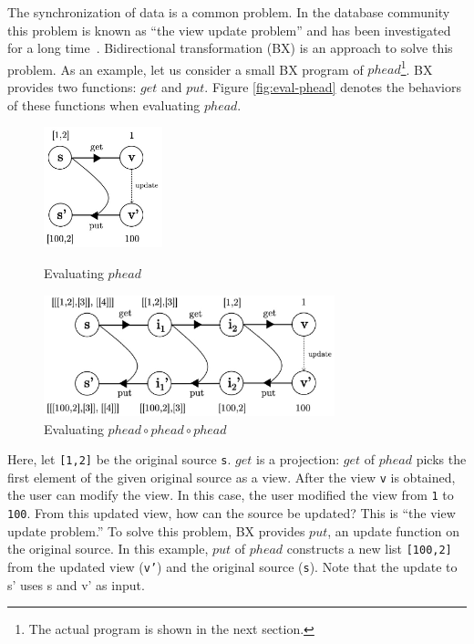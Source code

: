 The synchronization of data is a common problem. In the database community this problem is known as “the view update problem” and has been investigated for a long time~\cite{Bancilhon:1981:USR:319628.319634}. Bidirectional transformation (BX) is an approach to solve this problem.
As an example, let us consider a small BX program of $phead$\footnote{The actual program is shown in the next section.}. BX provides two functions: $get$ and $put$. Figure \ref{fig:eval-phead} denotes the behaviors of these functions when evaluating $phead$.

\begin{figure}[!t]
  \begin{minipage}{0.3\textwidth}
    \centering
    \includegraphics[height=3.5cm]{./fig/fig1.eps}
    \caption{Evaluating $phead$}
    \label{fig:eval-phead}
  \end{minipage}\hfill
  \begin{minipage}{0.7\textwidth}
    \centering
    \includegraphics[height=3.5cm]{./fig/fig2.eps}
    \caption{Evaluating $phead \circ phead \circ phead$}
    \label{fig:eval-comp-phead}
  \end{minipage}
\end{figure}

Here, let \texttt{[1,2]} be the original source \texttt{s}.
$get$ is a projection: $get$ of $phead$ picks the first element of the given original source as a view.
After the view \texttt{v} is obtained, the user can modify the view.
In this case, the user
modified the view
from \texttt{1} to \texttt{100}.
From this updated view, how can the source be updated?
This is ``the view update problem.''
To solve this problem, BX provides $put$, an update function on the original source.
In this example, $put$ of $phead$ constructs a new list \texttt{[100,2]} from the updated view (\texttt{v'}) and the original source (\texttt{s}).
Note that the update to s' uses s and v' as input.


